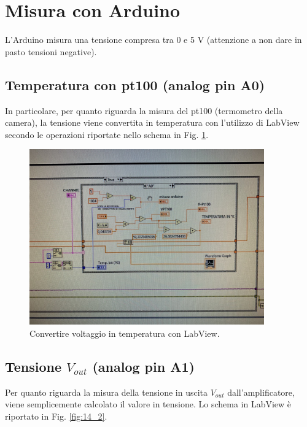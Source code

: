 \documentclass[../main/main.tex]{subfiles}
\begin{document}

\section{Misura con Arduino}

L'Arduino misura una tensione compresa tra 0 e 5 V (attenzione a non dare in pasto tensioni negative). 

\subsection{Temperatura con pt100 (analog pin A0)}

In particolare, per quanto riguarda la misura del pt100 (termometro della camera), la tensione viene convertita in temperatura con l'utilizzo di LabView secondo le operazioni riportate nello schema in Fig. \ref{fig:14_1}.


\begin{figure}[h!]
\centering
\includegraphics[width=0.9\textwidth]{../lessons/image/14/1.jpg}
\caption{\label{fig:14_1} Convertire voltaggio in temperatura con LabView.}
\end{figure}

\subsection{Tensione \(V_{out}\) (analog pin A1)}

Per quanto riguarda la misura della tensione in uscita \(V_{out}\) dall'amplificatore, viene semplicemente calcolato il valore in tensione. Lo schema in LabView è riportato in Fig. \ref{fig:14_2}.
\end{document}
